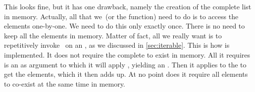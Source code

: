 This looks fine, but it has one drawback, namely the creation of the complete list in memory.
Actually, all that we~(or the  function) need to do is to access the elements one-by-one.
We need to do this only exactly once.
There is no need to keep all the elements in memory.
Matter of fact, all we really want is to repetitively invoke~ on an , as we discussed in \cref{sec:iterable}.
This is how  is implemented.
It does not require the complete  to exist in memory.
All it requires is an  as argument to which it will apply , yielding an .
Then it applies  to the  to get the elements, which it then adds up.
At no point does it require all elements to co-exist at the same time in memory.

